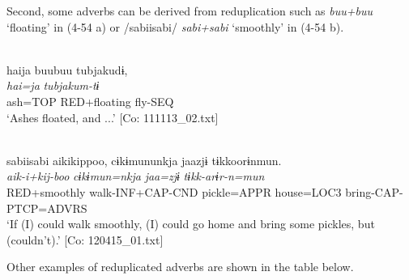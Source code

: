 Second, some adverbs can be derived from reduplication such as \textit{buu+buu} ‘floating’ in (4-54 a) or /sabiisabi/ \textit{sabi+sabi} ‘smoothly’ in (4-54 b).

\ea  \label{ex:4.54}
\ea{}\\\label{ex:4.54a}
\glll    haija  buubuu  tubjakudɨ,\\
      \textit{hai=ja}  \textit{}  \textit{tubjakum-tɨ}\\
      ash=TOP  RED+floating  fly-SEQ\\
    \glt       ‘Ashes floated, and ...’ [Co: 111113\_02.txt]

\ex{}\\\label{ex:4.54b}
\glll sabiisabi  aikikippoo,  cɨkɨmununkja  jaazjɨ  tɨkkoorɨnmun.\\
      \textit{}  \textit{aik-i+kij-boo}  \textit{cɨkɨmun=nkja}  \textit{jaa=zjɨ}  \textit{tɨkk-arɨr-n=mun}\\
      RED+smoothly  walk-INF+CAP-CND  pickle=APPR   house=LOC3  bring-CAP-PTCP=ADVRS\\      
      \glt ‘If (I) could walk smoothly, (I) could go home and bring some pickles, but (couldn’t).’   [Co: 120415\_01.txt]
    \z
\z

Other examples of reduplicated adverbs are shown in the table below.

